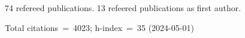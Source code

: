 74 refereed publications. 13 refeered publications as first author.

Total citations~=~4023; h-index~=~35 (2024-05-01)